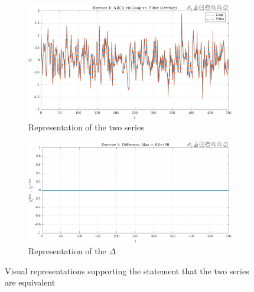 \documentclass[dvipsnames,11pt]{article}
\begin{document}
\begin{enumerate}[label=\alph*.]
\begin{solution}
                \begin{figure}[h]
                     \centering
                     \begin{subfigure}[b]{0.99\textwidth}
                         \centering
                         \includegraphics[width=\textwidth, trim=0cm 0cm 0cm 0.55cm, clip]{output/ex1_overlay.png}
                         \caption{Representation of the two series}
                         \label{fig:ex1_overlay}   
                     \end{subfigure}
                     \vspace{0.5cm}
                     \begin{subfigure}[b]{0.99\textwidth}
                         \centering
                         \includegraphics[width=\textwidth, trim=0cm 0cm 0cm 0.6cm, clip]{output/ex1_difference.png}
                         \caption{Representation of the \(\Delta\)}
                         \label{fig:ex1_difference}
                     \end{subfigure}
                        \label{fig:ex_1c}
                        \caption{Visual representations supporting the statement that the two series are equivalent}
                \end{figure}
        
            \end{solution}  

    \end{enumerate}
\end{document}
